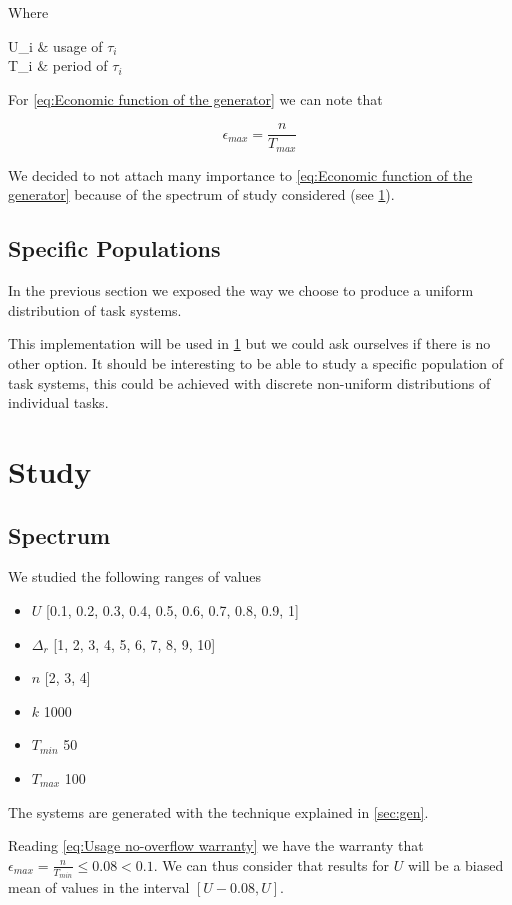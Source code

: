 \documentclass[a4paper,12pt]{article}
\begin{document}
Where
\begin{conditions}
	U_i	&	usage of $\tau_i$ \\
	T_i	&	period of $\tau_i$
\end{conditions}

For \ref{eq:Economic function of the generator} we can note that

\begin{equation}
	\epsilon_{max} = \frac{n}{T_{max}}
	\label{eq:Usage shift maximum}
\end{equation}

We decided to not attach many importance to \ref{eq:Economic function of the generator} because of the spectrum of study considered (see \ref{sec:study}).
\subsection{Specific Populations}

In the previous section we exposed the way we choose to produce a uniform distribution of task systems.

This implementation will be used in \ref{sec:study} but we could ask ourselves if there is no other option.
It should be interesting to be able to study a specific population of task systems, this could be achieved with discrete non-uniform distributions of individual tasks.
\newpage\cleardoublepage{}
\section{Study}
\label{sec:study}
\subsection{Spectrum}

We studied the following ranges of values
\begin{itemize}
	\item{$U$} [0.1, 0.2, 0.3, 0.4, 0.5, 0.6, 0.7, 0.8, 0.9, 1]
	\item{$\Delta_r$} [1, 2, 3, 4, 5, 6, 7, 8, 9, 10]
	\item{$n$} [2, 3, 4]
	\item{$k$} 1000
	\item{$T_{min}$} 50
	\item{$T_{max}$} 100
\end{itemize}

The systems are generated with the technique explained in \ref{sec:gen}.

Reading \ref{eq:Usage no-overflow warranty} we have the warranty that $\epsilon_{max} = \frac{n}{T_{min}} \leq 0.08 < 0.1$.
We can thus consider that results for $U$ will be a biased mean of values in the interval $[U-0.08, U]$.
\end{document}
